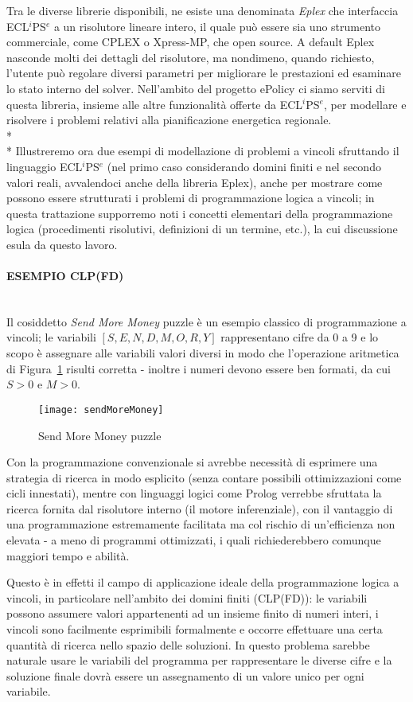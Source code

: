 \documentclass[12pt,a4paper,openright,twoside]{report}
\newcommand{\myparagraph}[1]{\paragraph{#1}\mbox{}\\}
\begin{document}
Tra le diverse librerie disponibili, ne esiste una denominata \emph{Eplex} \cite{eplex} che interfaccia ECL$^i$PS$^e$ a un risolutore lineare intero, il quale può essere sia uno strumento commerciale, come CPLEX o Xpress-MP, che open source. A default Eplex nasconde molti dei dettagli del risolutore, ma nondimeno, quando richiesto, l'utente può regolare diversi parametri per migliorare le prestazioni ed esaminare lo stato interno del solver. Nell'ambito del progetto ePolicy ci siamo serviti di questa libreria, insieme alle altre funzionalità offerte da ECL$^i$PS$^e$, per modellare e risolvere i problemi relativi alla pianificazione energetica regionale.
\\*\\*
Illustreremo ora due esempi di modellazione di problemi a vincoli sfruttando il linguaggio ECL$^i$PS$^e$ (nel primo caso considerando domini finiti e nel secondo valori reali, avvalendoci anche della libreria Eplex), anche per mostrare come possono essere strutturati i problemi di programmazione logica a vincoli; in questa trattazione supporremo noti i concetti elementari della programmazione logica (procedimenti risolutivi, definizioni di un termine, etc.), la cui discussione esula da questo lavoro.

\myparagraph{ESEMPIO CLP(FD)}
Il cosiddetto \emph{Send More Money} puzzle è un esempio classico di programmazione a vincoli; le variabili $[S,E,N,D,M,O,R,Y]$ rappresentano cifre da 0 a 9 e lo scopo è assegnare alle variabili valori diversi in modo che l'operazione aritmetica di Figura~\ref{SendMoreMoney} risulti corretta - inoltre i numeri devono essere ben formati, da cui $S>0$ e $M>0$. 

\begin{figure}[h]
	\centering
	\texttt{[image: sendMoreMoney]}
	\caption{Send More Money puzzle}
	\label{SendMoreMoney}
\end{figure}

Con la programmazione convenzionale si avrebbe necessità di esprimere una strategia di ricerca in modo esplicito (senza contare possibili ottimizzazioni come cicli innestati), mentre con linguaggi logici come Prolog verrebbe sfruttata la ricerca fornita dal risolutore interno (il motore inferenziale), con il vantaggio di una programmazione estremamente facilitata ma col rischio di un'efficienza non elevata - a meno di programmi ottimizzati, i quali richiederebbero comunque maggiori tempo e abilità. 

Questo è in effetti il campo di applicazione ideale della programmazione logica a vincoli, in particolare nell'ambito  dei domini finiti (CLP(FD)): le variabili possono assumere valori appartenenti ad un insieme finito di numeri interi, i vincoli sono facilmente esprimibili formalmente e occorre effettuare una certa quantità di ricerca nello spazio delle soluzioni. In questo problema sarebbe naturale usare le variabili del programma per rappresentare le diverse cifre e la soluzione finale dovrà essere un assegnamento di un valore unico per ogni variabile. 
\end{document}
